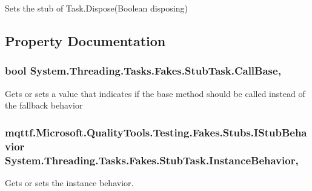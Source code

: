 Sets the stub of Task.\-Dispose(\-Boolean disposing)



\subsection{Property Documentation}
\hypertarget{class_system_1_1_threading_1_1_tasks_1_1_fakes_1_1_stub_task_aeaaf2e7b991b19ead6057f98258ace1c}{
\subsubsection[{Call\-Base}]{\setlength{\rightskip}{0pt plus 5cm}bool System.\-Threading.\-Tasks.\-Fakes.\-Stub\-Task.\-Call\-Base\hspace{0.3cm}{\ttfamily [get]}, {\ttfamily [set]}}}\label{class_system_1_1_threading_1_1_tasks_1_1_fakes_1_1_stub_task_aeaaf2e7b991b19ead6057f98258ace1c}


Gets or sets a value that indicates if the base method should be called instead of the fallback behavior

\hypertarget{class_system_1_1_threading_1_1_tasks_1_1_fakes_1_1_stub_task_a7b97ae908073f7f9f8201acd2b9972e2}{
\subsubsection[{Instance\-Behavior}]{\setlength{\rightskip}{0pt plus 5cm}mqttf.\-Microsoft.\-Quality\-Tools.\-Testing.\-Fakes.\-Stubs.\-I\-Stub\-Behavior System.\-Threading.\-Tasks.\-Fakes.\-Stub\-Task.\-Instance\-Behavior\hspace{0.3cm}{\ttfamily [get]}, {\ttfamily [set]}}}\label{class_system_1_1_threading_1_1_tasks_1_1_fakes_1_1_stub_task_a7b97ae908073f7f9f8201acd2b9972e2}


Gets or sets the instance behavior.

